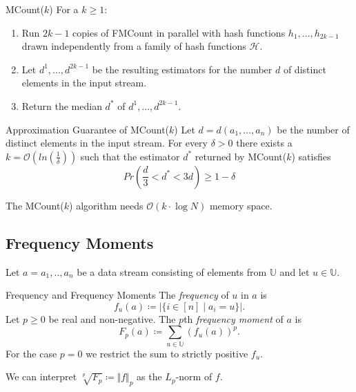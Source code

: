 \documentclass[english]{panikzettel}
\begin{document}
\begin{halfboxl}
\vspace{-\baselineskip}

\begin{algo}{MCount($k$)}
For a $k\geq 1$:
\begin{enumerate}
\item Run $2k-1$ copies of FMCount in parallel with hash functions $h_1,...,h_{2k-1}$ drawn independently from a family of hash functions $\mathcal{H}$.
\item Let $d^1,...,d^{2k-1}$ be the resulting estimators for the number $d$ of distinct elements in the input stream.
\item Return the median $d^*$ of $d^1,...,d^{2k-1}$.
\end{enumerate}
\end{algo}

\end{halfboxl}
\begin{halfboxr}
\vspace{-\baselineskip}

\begin{theo}{Approximation Guarantee of MCount($k$)}
Let $d=d(a_1,...,a_n)$ be the number of distinct elements in the input stream. For every $\delta > 0$ there exists a $k=\mathcal{O}(ln(\frac{1}{\delta}))$ such that the estimator $d^*$ returned by MCount($k$) satisfies
\[
Pr\left(\frac{d}{3}<d^* < 3d\right)\geq 1-\delta
\]
\end{theo}

\end{halfboxr}
The MCount($k$) algorithm needs $\mathcal{O}(k\cdot \log N)$ memory space.

\subsection{Frequency Moments}

Let $a=a_1,..,a_n$ be a data stream consisting of elements from $\mathbb{U}$ and let $u\in\mathbb{U}$.

\begin{defi}{Frequency and Frequency Moments}
The \emph{frequency} of $u$ in $a$ is
\[
f_u(a)\coloneqq  |\{i \in [n] \mid a_i=u \}|.
\]
Let $p\geq 0$ be real and non-negative. The $p$th \emph{frequency moment} of $a$ is
\[
F_p(a)\coloneqq \sum_{u\in\mathbb{U}}(f_u(a))^p.
\]
For the case $p=0$ we restrict the sum to strictly positive $f_u$.
\end{defi}

We can interpret $\sqrt[p]{F_p}\coloneqq\Vert f \Vert_p$ as the $L_p$-norm of $f$.
\end{document}
